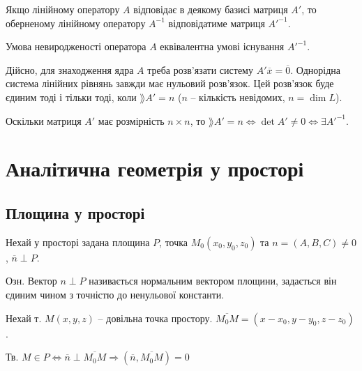 Якщо лінійному оператору $A$ відповідає в деякому базисі матриця $A'$, то
оберненому лінійному оператору $A^{-1}$ відповідатиме матриця $A'^{-1}$.


Умова невиродженості оператора $A$ еквівалентна умові існування $A'^{-1}$.

Дійсно, для знаходження ядра $A$ треба розв’язати систему $A'\overline{x} = \overline{0}$. Однорідна
система лінійних рівнянь завжди має нульовий розв’язок. Цей розв’язок буде
єдиним тоді і тільки тоді, коли $\rang A' = n$ ($n$ -- кількість невідомих, $n = \dim L$).

Оскільки матриця $A'$ має розмірність $n \times n$, то $\rang A' = n \Leftrightarrow \det A' \neq 0 \Leftrightarrow \exists A'^{-1}$.


\section{Аналітична геометрія у просторі}




\subsection{Площина у просторі}

Нехай у просторі задана площина $P$, точка $M_0(x_0,y_0,z_0)$ та
$n = (A,B,C) \neq 0$, $\overline{n} \perp P$.

Озн. Вектор $n \perp P$ називається нормальним вектором площини,
задається він єдиним чином з точністю до ненульової константи.







Нехай т. $M(x,y,z)$ -- довільна точка простору.
$\overline{M_0 M} = (x-x_0,y-y_0,z-z_0)$.

Тв. $M \in P \Leftrightarrow \overline{n} \perp \overline{M_0 M} \Rightarrow (\overline{n},\overline{M_0 M}) = 0$


